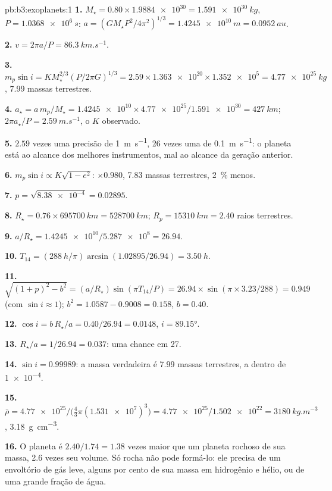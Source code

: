 \begin{solution}{pb:b3:exoplanets:1}
\textbf{1.} $M_\star = 0.80\times\num{1.9884e30} = \qty{1.591e30}{kg}$, $P =
\qty{1.0368e6}{s}$: $a = (GM_\star P^2/4\pi^2)^{1/3} = \qty{1.4245e10}{m}
= \qty{0.0952}{au}$.

\textbf{2.} $v = 2\pi a/P = \qty{86.3}{km.s^{-1}}$.

\textbf{3.} $m_p\sin i = KM_\star^{2/3}(P/2\pi G)^{1/3} = 2.59\times\num{1.363e20}
\times\num{1.352e5} = \qty{4.77e25}{kg}$, \num{7.99} massas terrestres.

\textbf{4.} $a_\star = a\,m_p/M_\star = \num{1.4245e10}\times\num{4.77e25}/
\num{1.591e30} = \qty{427}{km}$; $2\pi a_\star/P = \qty{2.59}{m.s^{-1}}$,
o $K$ observado.

\textbf{5.} $2.59$ vezes uma precisão de \qty{1}{m.s^{-1}}, 26 vezes uma de
\qty{0.1}{m.s^{-1}}: o planeta está ao alcance dos melhores instrumentos,
mal ao alcance da geração anterior.

\textbf{6.} $m_p\sin i \propto K\sqrt{1 - e^2}$: $\times0.980$, 7.83 massas
terrestres, \qty{2}{\percent} menos.

\textbf{7.} $p = \sqrt{\num{8.38e-4}} = 0.02895$.

\textbf{8.} $R_\star = 0.76\times\qty{695700}{km} = \qty{528700}{km}$; $R_p =
\qty{15310}{km} = 2.40$ raios terrestres.

\textbf{9.} $a/R_\star = \num{1.4245e10}/\num{5.287e8} = 26.94$.

\textbf{10.} $T_{14} = (\qty{288}{h}/\pi)\arcsin(1.02895/26.94) = \qty{3.50}{h}$.

\textbf{11.} $\sqrt{(1 + p)^2 - b^2} = (a/R_\star)\sin(\pi T_{14}/P) = 26.94\times
\sin(\pi\times3.23/288) = 0.949$ (com $\sin i \approx 1$); $b^2 =
1.0587 - 0.9008 = 0.158$, $b = 0.40$.

\textbf{12.} $\cos i = b\,R_\star/a = 0.40/26.94 = 0.0148$, $i = \ang{89.15}$.

\textbf{13.} $R_\star/a = 1/26.94 = 0.037$: uma chance em 27.

\textbf{14.} $\sin i = 0.99989$: a massa verdadeira é 7.99 massas terrestres, a 
dentro de \num{1e-4}.

\textbf{15.} $\bar\rho = \num{4.77e25}/\bigl(\tfrac43\pi(\num{1.531e7})^3\bigr) =
\num{4.77e25}/\num{1.502e22} = \qty{3180}{kg.m^{-3}}$,
\qty{3.18}{g.cm^{-3}}.

\textbf{16.} O planeta é $2.40/1.74 = 1.38$ vezes maior que um planeta rochoso de
sua massa, 2.6 vezes seu volume. Só rocha não pode formá-lo: ele precisa de um
envoltório de gás leve, alguns por cento de sua massa em hidrogênio e hélio,
ou de uma grande fração de água.


\end{solution}
